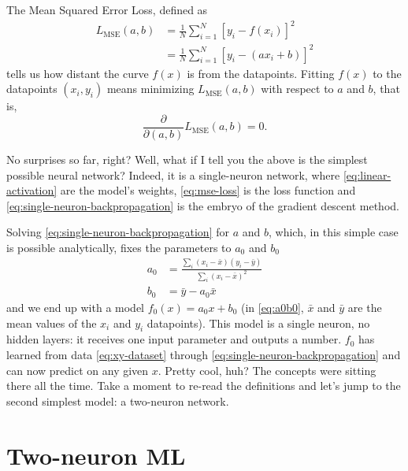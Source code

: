 \documentclass[11pt,a4paper,oneside]{book}
\theoremstyle{definition}
\theoremstyle{plain}
\theoremstyle{remark}
\begin{document}
The Mean Squared Error Loss, defined as
\begin{equation}
    \begin{split}
        \label{eq:mse-loss}
        L_\text{MSE}(a,b) &= \frac{1}{N}\sum_{i=1}^N[y_i - f(x_i)]^2 \\
                        &= \frac{1}{N}\sum_{i=1}^N[y_i - (ax_i + b)]^2
    \end{split}
\end{equation}
tells us how distant the curve $f(x)$ is from the datapoints. Fitting $f(x)$ to the datapoints $(x_i,y_i)$ means minimizing $L_\text{MSE}(a,b)$ with respect to $a$ and $b$, that is,
\begin{equation}
    \label{eq:single-neuron-backpropagation}
    \frac{\partial}{\partial(a,b)}L_\text{MSE}(a,b) = 0.
\end{equation}

No surprises so far, right? Well, what if I tell you the above is the simplest possible neural network? Indeed, it is a single-neuron network, where \eqref{eq:linear-activation} are the model's weights, \eqref{eq:mse-loss} is the loss function and \eqref{eq:single-neuron-backpropagation} is the embryo of the gradient descent method.

Solving \eqref{eq:single-neuron-backpropagation} for $a$ and $b$, which, in this simple case is possible analytically, fixes the parameters to $a_0$ and $b_0$
\begin{equation}
    \begin{split}
        \label{eq:a0b0}
        a_0 &= \frac{\sum_i(x_i-\bar x)(y_i-\bar y)}{\sum_i(x_i-\bar x)^2} \\
        b_0 &= \bar y-a_0\bar x
    \end{split}
\end{equation}
and we end up with a model $f_0(x) = a_0x+b_0$ (in \eqref{eq:a0b0}, $\bar x$ and $\bar y$ are the mean values of the $x_i$ and $y_i$ datapoints). This model is a single neuron, no hidden layers: it receives one input parameter and outputs a number. $f_0$ has learned from data \eqref{eq:xy-dataset} through \eqref{eq:single-neuron-backpropagation} and can now predict on any given $x$. Pretty cool, huh? The concepts were sitting there all the time. Take a moment to re-read the definitions and let's jump to the second simplest model: a two-neuron network.


\chapter{Two-neuron ML}
\label{chap:two-neuron}
\end{document}
